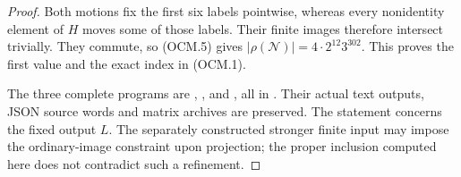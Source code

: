 \begin{proof}
Both motions fix the first six labels pointwise,
whereas every nonidentity element of $H$ moves
some of those labels.  Their finite images
therefore intersect trivially.  They commute,
so (OCM.5) gives
$|\rho(\mathcal N)|=4\cdot2^{12}3^{302}$.
This proves the first value and the exact index
in (OCM.1).

The three complete programs are
,
, and
,
all in .
Their actual text outputs, JSON source words and
matrix archives are preserved.
The statement concerns the fixed output $L$.
The separately constructed stronger finite input
may impose the ordinary-image constraint upon
projection; the proper inclusion computed here
does not contradict such a refinement.
\end{proof}
